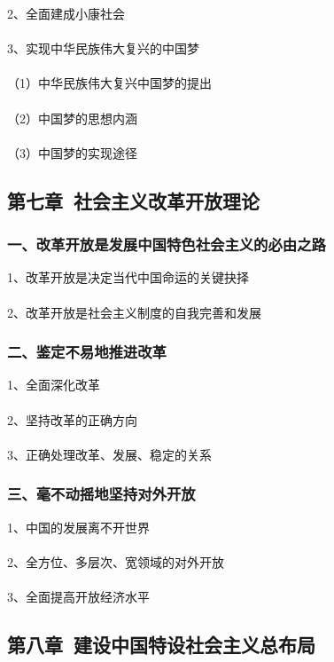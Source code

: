 \documentclass{ctexart}
\begin{document}
2、全面建成小康社会
\\\\

3、实现中华民族伟大复兴的中国梦
\\\\
（1）中华民族伟大复兴中国梦的提出
\\\\
（2）中国梦的思想内涵
\\\\
（3）中国梦的实现途径

\subsection{第七章\ 社会主义改革开放理论}
\subsubsection{一、改革开放是发展中国特色社会主义的必由之路}
1、改革开放是决定当代中国命运的关键抉择
\\\\

2、改革开放是社会主义制度的自我完善和发展

\subsubsection{二、鉴定不易地推进改革}
1、全面深化改革
\\\\

2、坚持改革的正确方向
\\\\

3、正确处理改革、发展、稳定的关系

\subsubsection{三、毫不动摇地坚持对外开放}
1、中国的发展离不开世界
\\\\

2、全方位、多层次、宽领域的对外开放
\\\\

3、全面提高开放经济水平



\subsection{第八章\ 建设中国特设社会主义总布局}
\end{document}
